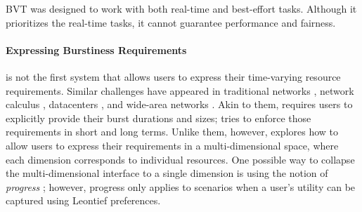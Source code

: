 BVT \cite{bvt} was designed to work with both real-time and best-effort tasks. Although it prioritizes the real-time tasks, it cannot guarantee performance and fairness.

\paragraph{Expressing Burstiness Requirements}
{\name} is not the first system that allows users to express their time-varying resource requirements. 
Similar challenges have appeared in traditional networks \cite{hfsc}, network calculus \cite{cruz1, cruz2}, datacenters \cite{silo, pulsar}, and wide-area networks \cite{bwe}.
Akin to them, {\name} requires users to explicitly provide their burst durations and sizes; {\name} tries to enforce those requirements in short and long terms. 
Unlike them, however, {\name} explores how to allow users to express their requirements in a multi-dimensional space, where each dimension corresponds to individual resources. 
One possible way to collapse the multi-dimensional interface to a single dimension is using the notion of \emph{progress} \cite{hug, drf}; however, progress only applies to scenarios when a user's utility can be captured using Leontief preferences. 